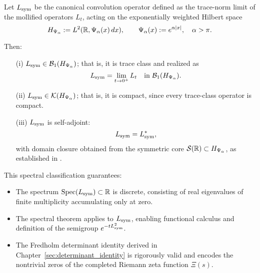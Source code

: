 \begin{theorem}
\label{thm:sa_trace_class_Lsym}
Let \( L_{\mathrm{sym}} \) be the canonical convolution operator defined as the trace-norm limit of the mollified operators \( L_t \), acting on the exponentially weighted Hilbert space
\[
H_{\Psi_\alpha} := L^2(\mathbb{R}, \Psi_\alpha(x)\, dx), \qquad \Psi_\alpha(x) := e^{\alpha |x|}, \quad \alpha > \pi.
\]

Then:
\begin{enumerate}
  \item[\textnormal{(i)}] \( L_{\mathrm{sym}} \in \mathcal{B}_1(H_{\Psi_\alpha}) \); that is, it is trace class and realized as
  \[
  L_{\mathrm{sym}} = \lim_{t \to 0^+} L_t \quad \text{in } \mathcal{B}_1(H_{\Psi_\alpha}).
  \]

  \item[\textnormal{(ii)}] \( L_{\mathrm{sym}} \in \mathcal{K}(H_{\Psi_\alpha}) \); that is, it is compact, since every trace-class operator is compact.

  \item[\textnormal{(iii)}] \( L_{\mathrm{sym}} \) is self-adjoint:
  \[
  L_{\mathrm{sym}} = L_{\mathrm{sym}}^*,
  \]
  with domain closure obtained from the symmetric core \( \mathcal{S}(\mathbb{R}) \subset H_{\Psi_\alpha} \), as established in .
\end{enumerate}

\medskip

\noindent
This spectral classification guarantees:
\begin{itemize}
  \item The spectrum \( \operatorname{Spec}(L_{\mathrm{sym}}) \subset \mathbb{R} \) is discrete, consisting of real eigenvalues of finite multiplicity accumulating only at zero.
  \item The spectral theorem applies to \( L_{\mathrm{sym}} \), enabling functional calculus and definition of the semigroup \( e^{-tL_{\mathrm{sym}}^2} \).
  \item The Fredholm determinant identity derived in Chapter~\ref{sec:determinant_identity} is rigorously valid and encodes the nontrivial zeros of the completed Riemann zeta function \( \Xi(s) \).
\end{itemize}
\end{theorem}
